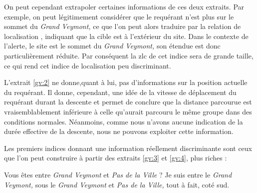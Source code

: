 On peut cependant extrapoler certaines informations de ces deux
extraits. Par exemple, on peut légitimement considérer que le
requérant n'est plus sur le sommet du \emph{Grand Veymont,} ce que
l'on peut alors traduire par la relation de localisation
, indiquant que la cible est à
l'extérieur du site. Dans le contexte de l'alerte, le site est le
sommet du \emph{Grand Veymont,} son étendue est donc particulièrement
réduite. Par conséquent la \ac{zlc} de cet indice sera de grande
taille, ce qui rend cet indice de localisation peu discriminant.

L'extrait \ref{gv:2} ne donne,quant à lui, pas d'informations sur la
position actuelle du requérant. Il donne, cependant, une idée de la
vitesse de déplacement du requérant durant la descente et permet de
conclure que la distance parcourue est vraisemblablement inférieure à
celle qu'aurait parcouru le même groupe dans des conditions
normales. Néanmoins, comme nous n'avons aucune indication de la durée
effective de la descente, nous ne pouvons exploiter cette information.

Les premiers indices donnant une information réellement discriminante
sont ceux que l'on peut construire à partir des extraits \ref{gv:3} et
\ref{gv:4}, plus riches :
%
\begin{dialogue*}
  \Sec {} Vous êtes entre \emph{Grand Veymont} et
  \emph{Pas de la Ville} ?
  \Req {} Je suis entre le \emph{Grand Veymont,}
   sous le \emph{Grand Veymont} et \emph{Pas de la
    Ville,} tout à fait,  coté sud.
\end{dialogue*}

